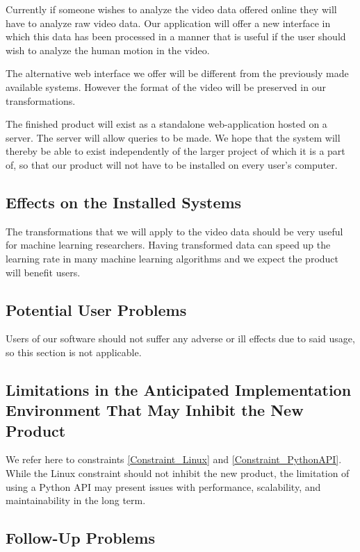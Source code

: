 \documentclass{scrreprt}
\begin{document}
{Currently if someone wishes to analyze the video data offered online
they will have to analyze raw video data. Our application will offer a
new interface in which this data has been processed in a manner that is
useful if the user should wish to analyze the human motion in the
video.}

{The alternative web interface we offer will be different from the previously
made available systems. However the format of the video will be preserved in
our transformations.}

{The finished product will exist as a standalone web-application hosted on a
server. The server will allow queries to be made. We hope that the system
will thereby be able to exist independently of the larger project of which it
is a part of, so that our product will not have to be installed on every user's
computer.}

\subsection{Effects on the Installed Systems}

{The transformations that we will apply to the video data should be very
useful for machine learning researchers. Having transformed data can
speed up the learning rate in many machine learning algorithms and we
expect the product will benefit users.}

\subsection{Potential User Problems}

Users of our software should not suffer any adverse or ill effects due to said
usage, so this section is not applicable.

\subsection{Limitations in the Anticipated Implementation Environment That May
            Inhibit the New Product}

We refer here to constraints \ref{Constraint_Linux} and \ref{Constraint_PythonAPI}.
While the Linux constraint should not inhibit the new product, the limitation
of using a Python API may present issues with performance, scalability, and
maintainability in the long term.

\subsection{Follow-Up Problems}
\end{document}

